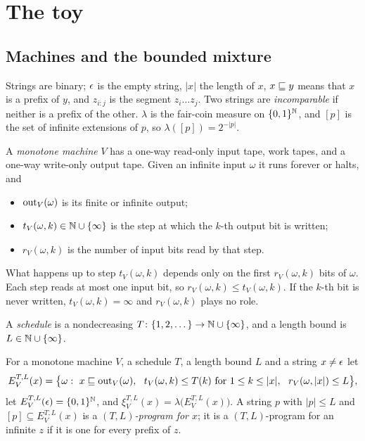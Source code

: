 \section{The toy}\label{sec:toy}

\subsection{Machines and the bounded mixture}

Strings are binary; $\epsilon$ is the empty string, $|x|$ the length of $x$, $x\sqsubseteq y$ means that $x$ is a prefix
of $y$, and $z_{i:j}$ is the segment $z_i\dots z_j$. Two strings are \emph{incomparable} if neither is a
prefix
of the other. $\lambda$ is the fair-coin measure on $\{0,1\}^{\mathbb{N}}$, and $[p]$ is the set of infinite extensions of
$p$, so $\lambda([p])=2^{-|p|}$.

A \emph{monotone machine} $V$ has a one-way read-only input tape, work tapes, and a one-way write-only output
tape. Given an infinite input $\omega$ it runs forever or halts, and
\begin{itemize}[leftmargin=1.4em,itemsep=1pt,topsep=2pt]
\item $\mathrm{out}_V(\omega)$ is its finite or infinite output;
\item $t_V(\omega,k)\in\mathbb{N}\cup\{\infty\}$ is the step at which the $k$-th output bit is written;
\item $r_V(\omega,k)$ is the number of input bits read by that step.
\end{itemize}
What happens up to step $t_V(\omega,k)$ depends only on the first $r_V(\omega,k)$ bits of $\omega$. Each step
reads at most one input bit, so $r_V(\omega,k)\le t_V(\omega,k)$. If the $k$-th bit is never written,
$t_V(\omega,k)=\infty$ and $r_V(\omega,k)$ plays no role.

A \emph{schedule} is a nondecreasing $T\colon\{1,2,\dots\}\to\mathbb{N}\cup\{\infty\}$, and a length bound is
$L\in\mathbb{N}\cup\{\infty\}$.

\begin{definition}\label{def:mixture}
For a monotone machine $V$, a schedule $T$, a length bound $L$ and a string $x\neq\epsilon$ let
\[
E_V^{T,L}(x)=\bigl\{\omega:\ x\pre\out_V(\omega),\ \ t_V(\omega,k)\le T(k)\text{ for }1\le k\le|x|,\ \
r_V(\omega,|x|)\le L\bigr\},
\]
let $E_V^{T,L}(\epsilon)=\{0,1\}^{\mathbb{N}}$, and $\xi_V^{T,L}(x)=\lambda\bigl(E_V^{T,L}(x)\bigr)$. A string $p$ with
$|p|\le L$ and
$[p]\subseteq E_V^{T,L}(x)$ is a \emph{$(T,L)$-program for $x$}; it is a $(T,L)$-program for an infinite $z$
if it is one for every prefix of $z$.
\end{definition}

